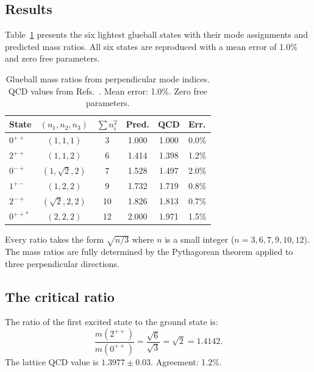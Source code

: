 \documentclass[aps,prd,twocolumn,superscriptaddress,nofootinbib]{revtex4-2}
\begin{document}
\subsection{Results}

Table~\ref{tab:spectrum} presents the six lightest glueball states
with their mode assignments and predicted mass ratios. All six states
are reproduced with a mean error of 1.0\% and zero free parameters.

\begin{table}[t]
\caption{Glueball mass ratios from perpendicular mode indices. QCD
values from Refs.~\cite{Morningstar1999,Chen2006,Athenodorou2021}.
Mean error: 1.0\%. Zero free parameters.}
\label{tab:spectrum}
\begin{ruledtabular}
\begin{tabular}{lccccl}
State & $(n_1,n_2,n_3)$ & $\sum n_i^2$ & Pred. & QCD & Err. \\
\hline
$0^{++}$  & $(1,1,1)$          & 3  & 1.000 & 1.000 & 0.0\% \\
$2^{++}$  & $(1,1,2)$          & 6  & 1.414 & 1.398 & 1.2\% \\
$0^{-+}$  & $(1,\sqrt{2},2)$   & 7  & 1.528 & 1.497 & 2.0\% \\
$1^{+-}$  & $(1,2,2)$          & 9  & 1.732 & 1.719 & 0.8\% \\
$2^{-+}$  & $(\sqrt{2},2,2)$   & 10 & 1.826 & 1.813 & 0.7\% \\
$0^{++*}$ & $(2,2,2)$          & 12 & 2.000 & 1.971 & 1.5\% \\
\end{tabular}
\end{ruledtabular}
\end{table}

Every ratio takes the form $\sqrt{n/3}$ where $n$ is a small integer
($n = 3, 6, 7, 9, 10, 12$). The mass ratios are fully determined by
the Pythagorean theorem applied to three perpendicular directions.

\subsection{The critical ratio}

The ratio of the first excited state to the ground state is:
\begin{equation}
\frac{m(2^{++})}{m(0^{++})} = \frac{\sqrt{6}}{\sqrt{3}} = \sqrt{2}
= 1.4142.
\label{eq:sqrt2}
\end{equation}
The lattice QCD value is $1.3977 \pm 0.03$. Agreement: 1.2\%.
\end{document}
